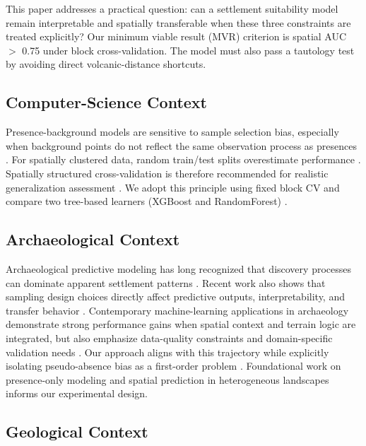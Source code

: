\documentclass[12pt]{article}
\begin{document}
This paper addresses a practical question: can a settlement suitability model remain interpretable and spatially transferable when these three constraints are treated explicitly?
Our minimum viable result (MVR) criterion is spatial AUC $>$ 0.75 under block cross-validation.
The model must also pass a tautology test by avoiding direct volcanic-distance shortcuts.

\subsection{Computer-Science Context}

Presence-background models are sensitive to sample selection bias, especially when background points do not reflect the same observation process as presences \citep{phillips2009,elith2006,araujo2006}.
For spatially clustered data, random train/test splits overestimate performance \citep{kohavi1995}.
Spatially structured cross-validation is therefore recommended for realistic generalization assessment \citep{roberts2017,valavi2019}.
We adopt this principle using fixed block CV and compare two tree-based learners (XGBoost and RandomForest) \citep{chen2016,breiman2001}.

\subsection{Archaeological Context}

Archaeological predictive modeling has long recognized that discovery processes can dominate apparent settlement patterns \citep{verhagen2012,kamermans2019,verhagen2020}.
Recent work also shows that sampling design choices directly affect predictive outputs, interpretability, and transfer behavior \citep{comer2023}.
Contemporary machine-learning applications in archaeology demonstrate strong performance gains when spatial context and terrain logic are integrated, but also emphasize data-quality constraints and domain-specific validation needs \citep{castiello2021,wang2023}.
Our approach aligns with this trajectory while explicitly isolating pseudo-absence bias as a first-order problem \citep{barbet2012,senay2013,wisz2009,lobo2010}. Foundational work on presence-only modeling \citep{phillips2006,kvamme2006} and spatial prediction in heterogeneous landscapes \citep{nuninger2016,araujo2005} informs our experimental design.

\subsection{Geological Context}
\end{document}
